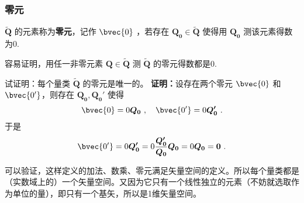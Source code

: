 \subsubsection{零元}
\begin{definition}{}
$\tilde{\boldsymbol{Q}}$ 的元素称为\textbf{零元}，记作 $\bvec{0}$ ，若存在 $\boldsymbol{Q_0}\in\tilde{\boldsymbol{Q}}$ 使得用 $\boldsymbol{Q_0}$ 测该元素得数为0.
\end{definition}
容易证明，用任一非零元素 $\boldsymbol{Q}\in\tilde{\boldsymbol{Q}}$ 测 $\tilde{\boldsymbol{Q}}$ 的零元得数都是0.
\begin{example}{}
试证明：每个量类 $\tilde{\boldsymbol{Q}}$ 的零元是唯一的。
\textbf{证明：}设存在两个零元 $\bvec{0}$ 和 $\bvec{0'}$，则存在 $\boldsymbol{Q_0},\boldsymbol{Q_0'}$ 使得 
\begin{equation}
\bvec{0}=0\boldsymbol{Q_0}~,\quad \bvec{0'}=0\boldsymbol{Q_0'}~.
\end{equation}
于是
\begin{equation}
\bvec{0'}=0\boldsymbol{Q_0'}=0\frac{\boldsymbol{Q_0'}}{\boldsymbol{Q_0}}\boldsymbol{Q_0}=0\boldsymbol{Q_0}=\boldsymbol{0}~.
\end{equation}
\end{example}
可以验证，这样定义的加法、数乘、零元满足矢量空间的定义。所以每个量类都是（实数域上的）一个矢量空间。又因为它只有一个线性独立的元素（不妨就选取作为单位的量），即只有一个基矢，所以是1维矢量空间。
